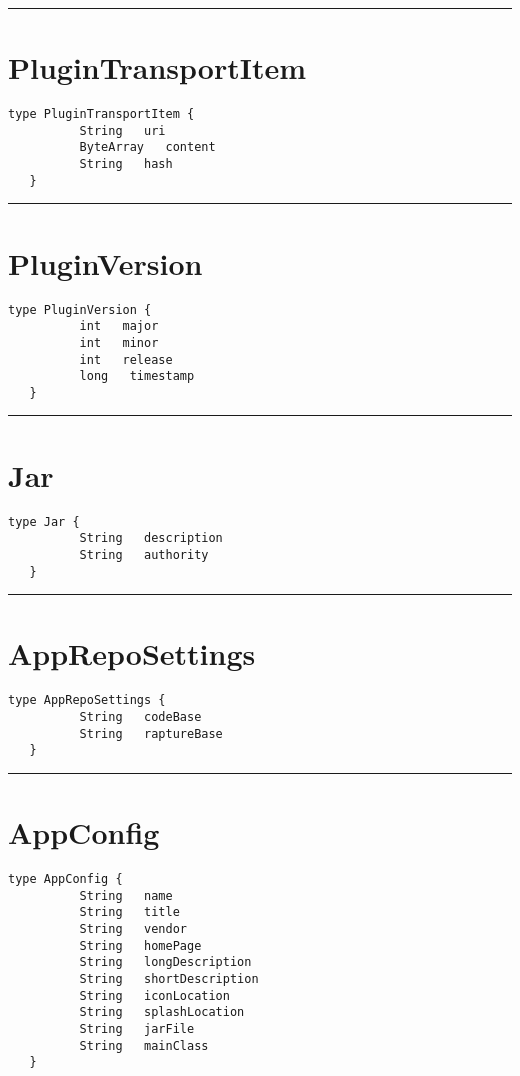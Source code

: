 \rule{12cm}{2pt}
\section{PluginTransportItem}
\label{type:PluginTransportItem}

\begin{lstlisting}[style=nonumbers]
   type PluginTransportItem {
          String   uri
          ByteArray   content
          String   hash
   }
\end{lstlisting}

\rule{12cm}{2pt}
\section{PluginVersion}
\label{type:PluginVersion}

\begin{lstlisting}[style=nonumbers]
   type PluginVersion {
          int   major
          int   minor
          int   release
          long   timestamp
   }
\end{lstlisting}

\rule{12cm}{2pt}
\section{Jar}
\label{type:Jar}

\begin{lstlisting}[style=nonumbers]
   type Jar {
          String   description
          String   authority
   }
\end{lstlisting}

\rule{12cm}{2pt}
\section{AppRepoSettings}
\label{type:AppRepoSettings}

\begin{lstlisting}[style=nonumbers]
   type AppRepoSettings {
          String   codeBase
          String   raptureBase
   }
\end{lstlisting}

\rule{12cm}{2pt}
\section{AppConfig}
\label{type:AppConfig}

\begin{lstlisting}[style=nonumbers]
   type AppConfig {
          String   name
          String   title
          String   vendor
          String   homePage
          String   longDescription
          String   shortDescription
          String   iconLocation
          String   splashLocation
          String   jarFile
          String   mainClass
   }
\end{lstlisting}

